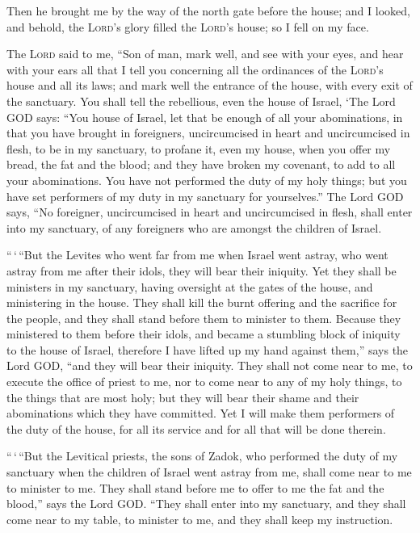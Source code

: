  Then he brought me by the way of the north gate before
the house; and I looked, and behold, the \textsc{Lord}'s glory filled
the \textsc{Lord}'s house; so I fell on my face.

 The \textsc{Lord} said to me, ``Son of man, mark well,
and see with your eyes, and hear with your ears all that I tell you
concerning all the ordinances of the \textsc{Lord}'s house and all its
laws; and mark well the entrance of the house, with every exit of the
sanctuary.  You shall tell the rebellious, even the house
of Israel, `The Lord GOD says: ``You house of Israel, let that be enough
of all your abominations,  in that you have brought in
foreigners, uncircumcised in heart and uncircumcised in flesh, to be in
my sanctuary, to profane it, even my house, when you offer my bread, the
fat and the blood; and they have broken my covenant, to add to all your
abominations.  You have not performed the duty of my holy
things; but you have set performers of my duty in my sanctuary for
yourselves.''  The Lord GOD says, ``No foreigner,
uncircumcised in heart and uncircumcised in flesh, shall enter into my
sanctuary, of any foreigners who are amongst the children of Israel.

 ``\,`\,``But the Levites who went far from me when
Israel went astray, who went astray from me after their idols, they will
bear their iniquity.  Yet they shall be ministers in my
sanctuary, having oversight at the gates of the house, and ministering
in the house. They shall kill the burnt offering and the sacrifice for
the people, and they shall stand before them to minister to them.
 Because they ministered to them before their idols, and
became a stumbling block of iniquity to the house of Israel, therefore I
have lifted up my hand against them,'' says the Lord GOD, ``and they
will bear their iniquity.  They shall not come near to
me, to execute the office of priest to me, nor to come near to any of my
holy things, to the things that are most holy; but they will bear their
shame and their abominations which they have committed. 
Yet I will make them performers of the duty of the house, for all its
service and for all that will be done therein.

 ``\,`\,``But the Levitical priests, the sons of Zadok,
who performed the duty of my sanctuary when the children of Israel went
astray from me, shall come near to me to minister to me. They shall
stand before me to offer to me the fat and the blood,'' says the Lord
GOD.  ``They shall enter into my sanctuary, and they
shall come near to my table, to minister to me, and they shall keep my
instruction.

